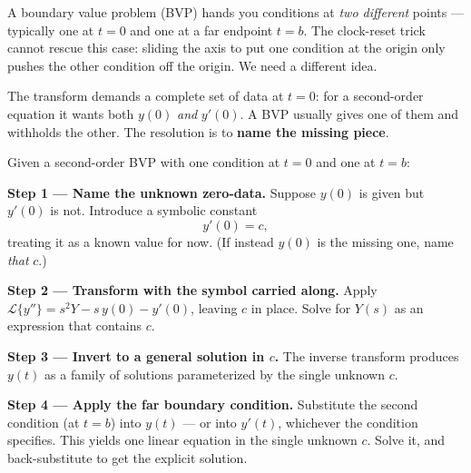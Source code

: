 \documentclass[11pt]{article}
\begin{document}
A boundary value problem (BVP) hands you conditions at \emph{two different} points --- typically one at $t = 0$ and one at a far endpoint $t = b$. The clock-reset trick cannot rescue this case: sliding the axis to put one condition at the origin only pushes the other condition off the origin. We need a different idea.

The transform demands a complete set of data at $t = 0$: for a second-order equation it wants both $y(0)$ \emph{and} $y'(0)$. A BVP usually gives one of them and withholds the other. The resolution is to \textbf{name the missing piece}.

\begin{methodbox}
Given a second-order BVP with one condition at $t = 0$ and one at $t = b$:

\smallskip
\textbf{Step 1 --- Name the unknown zero-data.} Suppose $y(0)$ is given but $y'(0)$ is not. Introduce a symbolic constant
\[ y'(0) = c, \]
treating it as a known value for now. (If instead $y(0)$ is the missing one, name \emph{that} $c$.)

\smallskip
\textbf{Step 2 --- Transform with the symbol carried along.} Apply $\mathcal{L}\{y''\} = s^2 Y - s\,y(0) - y'(0)$, leaving $c$ in place. Solve for $Y(s)$ as an expression that contains $c$.

\smallskip
\textbf{Step 3 --- Invert to a general solution in $c$.} The inverse transform produces $y(t)$ as a family of solutions parameterized by the single unknown $c$.

\smallskip
\textbf{Step 4 --- Apply the far boundary condition.} Substitute the second condition (at $t = b$) into $y(t)$ --- or into $y'(t)$, whichever the condition specifies. This yields one linear equation in the single unknown $c$. Solve it, and back-substitute to get the explicit solution.
\end{methodbox}
\end{document}

